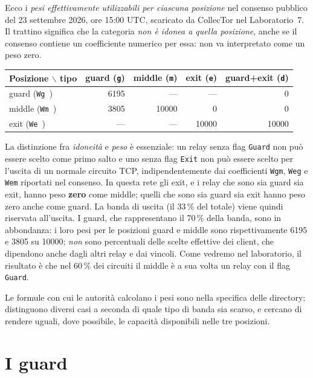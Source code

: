 Ecco i \emph{pesi effettivamente utilizzabili per ciascuna posizione}
nel consenso pubblico del 23 settembre 2026, ore 15:00 UTC, scaricato
da CollecTor nel Laboratorio~7. Il trattino significa che la categoria
\emph{non è idonea a quella posizione}, anche se il consenso contiene
un coefficiente numerico per essa: non va interpretato come un peso zero.
\begin{center}
\begin{tabular}{lrrrr}
\toprule
Posizione $\backslash$ tipo & guard (\texttt{g}) & middle (\texttt{m}) & exit (\texttt{e}) & guard+exit (\texttt{d}) \\
\midrule
guard (\texttt{Wg\,}) & 6195 & --- & --- & 0 \\
middle (\texttt{Wm\,}) & 3805 & 10000 & 0 & 0 \\
exit (\texttt{We\,}) & --- & --- & 10000 & 10000 \\
\bottomrule
\end{tabular}
\end{center}
La distinzione fra \emph{idoneità} e \emph{peso} è essenziale: un relay senza flag \texttt{Guard} non può essere scelto come primo salto e uno senza flag \texttt{Exit} non può essere scelto per l'uscita di un normale circuito TCP, indipendentemente dai coefficienti \texttt{Wgm}, \texttt{Weg} e \texttt{Wem} riportati nel consenso. In questa rete gli exit, e i relay che sono sia guard sia exit, hanno peso \textbf{zero} come middle; quelli che sono sia guard sia exit hanno peso zero anche come guard. La banda di uscita (il 33\,\% del totale) viene quindi riservata all'uscita. I guard, che rappresentano il 70\,\% della banda, sono in abbondanza: i loro pesi per le posizioni guard e middle sono rispettivamente 6195 e 3805 su 10000; \emph{non} sono percentuali delle scelte effettive dei client, che dipendono anche dagli altri relay e dai vincoli. Come vedremo nel laboratorio, il risultato è che nel 60\,\% dei circuiti il middle è a sua volta un relay con il flag \texttt{Guard}.

Le formule con cui le autorità calcolano i pesi sono nella specifica delle directory; distinguono diversi casi a seconda di quale tipo di banda sia scarso, e cercano di rendere uguali, dove possibile, le capacità disponibili nelle tre posizioni.

\section{I guard}\label{sec:guard}

